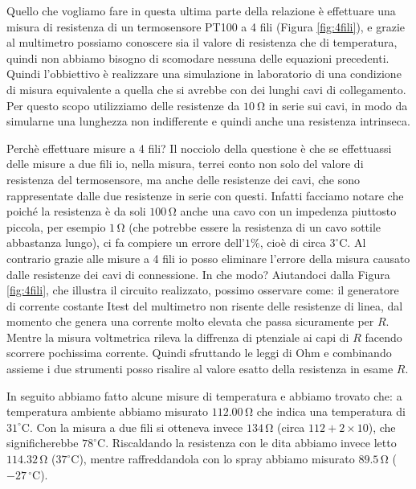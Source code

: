 Quello che vogliamo fare in questa ultima parte della relazione è effettuare una misura di resistenza di un termosensore PT100 a 4 fili (Figura \ref{fig:4fili}), e grazie al multimetro possiamo conoscere sia il valore di resistenza che di temperatura, quindi non abbiamo bisogno di scomodare nessuna delle equazioni precedenti. Quindi l'obbiettivo è realizzare una simulazione in laboratorio di una condizione di misura equivalente a quella che si avrebbe con dei lunghi cavi di collegamento.
Per questo scopo utilizziamo delle resistenze da $\SI{10}{\ohm}$ in serie sui cavi, in modo da simularne una lunghezza non indifferente e quindi anche una resistenza intrinseca.

Perchè effettuare misure a 4 fili? Il nocciolo della questione è che se effettuassi delle misure a due fili io, nella misura, terrei conto non solo del valore di resistenza del termosensore, ma anche delle resistenze dei cavi, che sono rappresentate dalle due resistenze in serie con questi. Infatti facciamo notare che poiché la resistenza è da soli $100\, \si{\ohm}$ anche una cavo con un impedenza piuttosto piccola, per esempio $1\,\si{\ohm}$ (che potrebbe essere la resistenza di un cavo sottile abbastanza lungo), ci fa compiere un errore dell'$1\%$, cioè di circa $3^\circ$C.
Al contrario grazie alle misure a 4 fili io posso eliminare l’errore della misura causato dalle resistenze dei cavi di connessione. In che modo? Aiutandoci dalla Figura \ref{fig:4fili}, che illustra il circuito realizzato, possimo osservare come: il generatore di corrente costante Itest del multimetro non risente delle resistenze di linea, dal momento che genera una corrente molto elevata che passa sicuramente per $R$. Mentre la misura voltmetrica rileva la diffrenza di ptenziale ai capi di $R$ facendo  scorrere pochissima corrente. Quindi sfruttando le leggi di Ohm e combinando assieme i due strumenti posso risalire al valore esatto della resistenza in esame $R$.

In seguito abbiamo fatto alcune misure di temperatura e abbiamo trovato che: a temperatura ambiente abbiamo misurato $112.00\,\si{\ohm}$ che indica una temperatura di $31^\circ$C. Con la misura a due fili si otteneva invece $134\,\si{\ohm}$ (circa $112 + 2 \times 10$), che significherebbe $78^\circ$C. Riscaldando la resistenza con le dita abbiamo invece letto $114.32\,\si{\ohm}$ ($37^\circ$C), mentre raffreddandola con lo spray abbiamo misurato $89.5\,\si{\ohm}$ ($-27\,^\circ$C).
